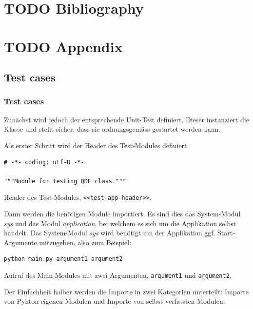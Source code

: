 \documentclass[10pt, openright, notitlepage]{scrreprt}
\begin{document}
\chapter{{\bfseries\sffamily TODO} Bibliography}
\label{sec:org69e8f5a}
\printbibliography{}
\chapter{{\bfseries\sffamily TODO} Appendix}
\label{sec:org763efd2}
\section{Test cases}
\label{sec:org9bd27e4}
\subsection{Test cases}
\label{sec:orgb68d405}

Zunächst wird jedoch der entsprechende Unit-Test definiert. Dieser instanziert
die Klasse und stellt sicher, dass sie ordnungsgemäss gestartet werden kann.

Als erster Schritt wird der Header des Test-Modules definiert.

\begin{listing}[H]
\begin{verbatim}
# -*- coding: utf-8 -*-

"""Module for testing QDE class."""
\end{verbatim}
\caption{\label{test-app-header}
Header des Test-Modules, \texttt{<<test-app-header>>}.}
\end{listing}

Dann werden die benötigen Module importiert. Es sind dies das System-Modul
\emph{sys} und das Modul \emph{application}, bei welchem es sich um die Applikation
selbst handelt. Das System-Modul \emph{sys} wird benötigt um der Applikation ggf.
Start-Argumente mitzugeben, also zum Beispiel:

\begin{listing}[H]
\begin{verbatim}
python main.py argument1 argument2
\end{verbatim}
\caption{\label{fig:impl-python-call-arguments}
Aufruf des Main-Modules mit zwei Argumenten, \texttt{argument1} und \texttt{argument2}.}
\end{listing}

Der Einfachheit halber werden die Importe in zwei Kategorien unterteilt: Importe
von Pyhton-eigenen Modulen und Importe von selbst verfassten Modulen.
\end{document}
